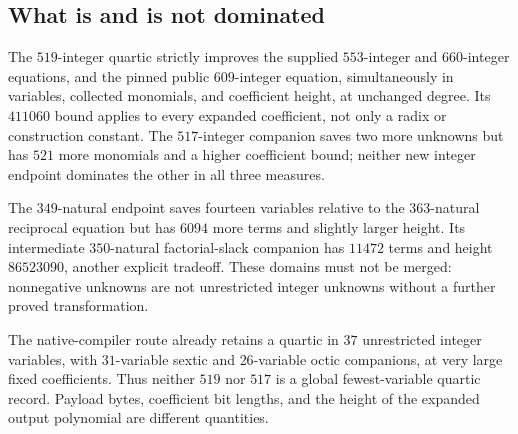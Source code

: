 \subsection{What is and is not dominated}
The $519$-integer quartic strictly improves the supplied $553$-integer and $660$-integer equations, and the pinned public $609$-integer equation, simultaneously in variables, collected monomials, and coefficient height, at unchanged degree. Its $411060$ bound applies to every expanded coefficient, not only a radix or construction constant. The $517$-integer companion saves two more unknowns but has $521$ more monomials and a higher coefficient bound; neither new integer endpoint dominates the other in all three measures.

The $349$-natural endpoint saves fourteen variables relative to the $363$-natural reciprocal equation but has $6094$ more terms and slightly larger height. Its intermediate $350$-natural factorial-slack companion has $11472$ terms and height $86523090$, another explicit tradeoff. These domains must not be merged: nonnegative unknowns are not unrestricted integer unknowns without a further proved transformation.

The native-compiler route already retains a quartic in $37$ unrestricted integer variables, with $31$-variable sextic and $26$-variable octic companions, at very large fixed coefficients. Thus neither $519$ nor $517$ is a global fewest-variable quartic record. Payload bytes, coefficient bit lengths, and the height of the expanded output polynomial are different quantities.

